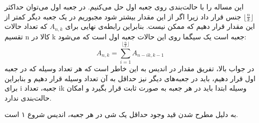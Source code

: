 \p
    این مساله را با حالت‌بندی روی جعبه اول حل می‌کنیم. در جعبه اول می‌توان حداکثر \( \lfloor \frac{n}{k} \rfloor \) جنس قرار داد زیرا اگر از این مقدار بیشتر شود مجبوریم در یک جعبه دیگر کمتر از این مقدار قرار دهیم که ممکن نیست. بنابراین رابطه‌ی نهایی برای \( A_{n,k} \) که تعداد حالات تقسیم n کالا در k جعبه است یک سیگما روی این حالات جعبه اول است که می‌شود:
\[ A_{n,k} = \sum\limits_{i=1}^{\lfloor \frac{n}{k} \rfloor}  A_{n-ik,k-1} \]در جواب بالا، تفریق مقدار  در اندیس به این خاطر است که هر تعداد وسیله که در جعبه اول قرار دهیم، باید در جعبه‌های دیگر نیز حداقل به آن تعداد وسیله قرار دهیم و بنابراین برای i جعبه، تعداد ik وسیله ابتدا باید در هر جعبه به صورت ثابت قرار بگیرد و امکان حالت‌بندی ندارد. 

به دلیل مطرح شدن قید وجود حداقل یک شی در هر جعبه، اندیس شروع ۱ است.

